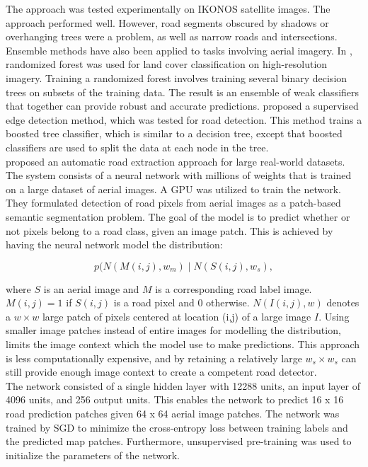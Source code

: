  The approach was tested experimentally on IKONOS satellite images. The approach performed well. However, road segments obscured by shadows or overhanging trees were a problem, as well as narrow roads and intersections.\\

Ensemble methods have also been applied to tasks involving aerial imagery. In \citep{Kluckner_semantic_height}, randomized forest was used for land cover classification on high-resolution imagery. Training a randomized forest involves training several binary decision trees on subsets of the training data. The result is an ensemble of weak classifiers that together can provide robust and accurate predictions. \cite{Dollar_supervised_edge} proposed a supervised edge detection method, which was tested for road detection. This method trains a boosted tree classifier, which is similar to a decision tree, except that boosted classifiers are used to split the data at each node in the tree.\\

\cite{Mnih_roads_high_res_aerial_images} proposed an automatic road extraction approach for large real-world datasets. The system consists of a neural network with millions of weights that is trained on a large dataset of aerial images. A \ac{GPU} was utilized to train the network.  \\

They formulated detection of road pixels from aerial images as a patch-based semantic segmentation problem. 
The goal of the model is to predict whether or not pixels belong to a road class, given an image patch. This is achieved by having the neural network model the distribution:

 $$p(N(M(i,j), w_m) \mid N(S(i,j), w_s),$$ 
 
\noindent where $S$ is an aerial image and $M$ is a corresponding road label image. $M(i,j) = 1$ if $S(i,j)$ is a road pixel and 0 otherwise.  $N(I(i,j), w)$  denotes a $w \times w$ large patch of pixels centered at location (i,j) of a large image $I$. Using smaller image patches instead of entire images for modelling the distribution, limits the image context which the model use to make predictions. This approach is less computationally expensive, and by retaining a relatively large $w_s \times w_s$ can still provide enough image context to create a competent road detector. \\

The network consisted of a single hidden layer with 12288 units, an input layer of 4096 units, and 256 output units. This enables the network to predict 16 x 16 road prediction patches given 64 x 64 aerial image patches. The network was trained by \ac{SGD} to minimize the cross-entropy loss between training labels and the predicted map patches. Furthermore, unsupervised pre-training was used to initialize the parameters of the network.\\

